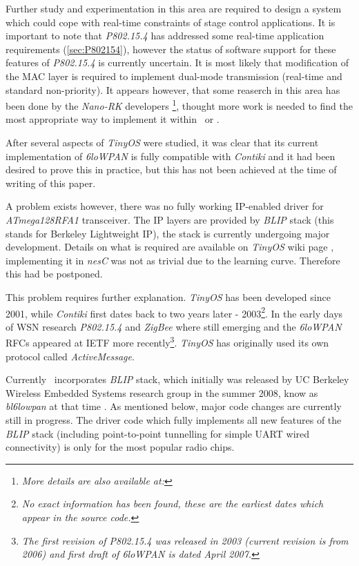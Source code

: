   Further study and experimentation in this area are required to design
 a system which could cope with real-time constraints of stage control
 applications. It is important to note that \emph{P802.15.4} has addressed
 some real-time application requirements (\ref{sec:P802154}), however the
 status of software support for these features of \emph{P802.15.4} is
 currently uncertain. It is most likely that modification of the MAC layer
 is required to implement dual-mode transmission (real-time and standard
 non-priority). It appears however, that some reaserch
 in this area has been done by the \emph{Nano-RK} developers
 \cite{pubs:nrk06c}\footnote{\emph{More details are also available at:
 }}, thought more work is needed
 to find the most appropriate way to implement it within \TinyOS\ or
 \Contiki.
 
  After several aspects of \emph{TinyOS} were studied, it was clear
 that its current implementation of \emph{6loWPAN} is fully compatible
 with \emph{Contiki} and it had been desired to prove this in practice,
 but this has not been achieved at the time of writing of this paper.
  
  A problem exists however, there was no fully working IP-enabled driver
 for \emph{ATmega128RFA1} transceiver. The IP layers are provided by
 \emph{BLIP} stack (this stands for Berkeley Lightweight IP), the stack
 is currently undergoing major development. Details on what is required
 are available on \emph{TinyOS} wiki page \cite{tinyos:wiki:blip20},
 implementing it in \emph{nesC} was not as trivial due to the learning
 curve. Therefore this had be postponed.

  This problem requires further explanation. \emph{TinyOS} has been
 developed since 2001, while \emph{Contiki} first dates back to two
 years later - 2003\footnote{\emph{No exact information has been
 found, these are the earliest dates which appear in the source code.}}. 
 In the early days of WSN research \emph{P802.15.4} and \emph{ZigBee}
 where still emerging and the \emph{6loWPAN} RFCs appeared at IETF more
 recently\footnote{\emph{The first revision of P802.15.4 was released
 in 2003 (current revision is from 2006) and first draft of 6loWPAN
 is dated April 2007.}}. \emph{TinyOS} has originally used its own
 protocol called \emph{ActiveMessage}.

  Currently \TinyOS\ incorporates \emph{BLIP} stack, which initially
 was released by UC Berkeley Wireless Embedded Systems research group
 in the summer 2008, know as \emph{bl6lowpan} at that time
 \cite{links:tinyos:blip}.
 As mentioned below, major code changes are currently still in progress.
 The driver code which fully implements all new features of the \emph{BLIP}
 stack (including point-to-point tunnelling for simple UART wired
 connectivity) is only for the most popular  radio chips.

